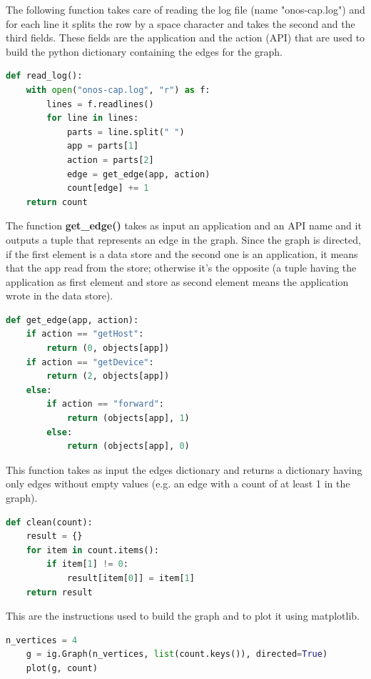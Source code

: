 The following function takes care of reading the log file (name "onos-cap.log") and for each line it splits the row by a space character and takes the second and the third fields. These fields are the application and the action (API) that are used to build the python dictionary containing the edges for the graph.
\begin{lstlisting}[language=python,firstnumber=39]
def read_log():
    with open("onos-cap.log", "r") as f:
        lines = f.readlines()
        for line in lines:
            parts = line.split(" ")
            app = parts[1]
            action = parts[2]
            edge = get_edge(app, action)
            count[edge] += 1
    return count
\end{lstlisting}

The function \textbf{get\_edge()} takes as input an application and an API name and it outputs a tuple that represents an edge in the graph. Since the graph is directed, if the first element is a data store and the second one is an application, it means that the app read from the store; otherwise it's the opposite (a tuple having the application as first element and store as second element means the application wrote in the data store).
\begin{lstlisting}[language=python,firstnumber=52]
def get_edge(app, action):
    if action == "getHost":
        return (0, objects[app])
    if action == "getDevice":
        return (2, objects[app])
    else:
        if action == "forward":
            return (objects[app], 1)
        else:
            return (objects[app], 0)
\end{lstlisting}

This function takes as input the edges dictionary and returns a dictionary having only edges without empty values (e.g. an edge with a count of at least 1 in the graph).
\begin{lstlisting}[language=python,firstnumber=52]
def clean(count):
    result = {}
    for item in count.items():
        if item[1] != 0:
            result[item[0]] = item[1]
    return result
\end{lstlisting}

This are the instructions used to build the graph and to plot it using matplotlib.
\begin{lstlisting}[language=python,firstnumber=185]
    n_vertices = 4
    g = ig.Graph(n_vertices, list(count.keys()), directed=True)
    plot(g, count)
\end{lstlisting}

